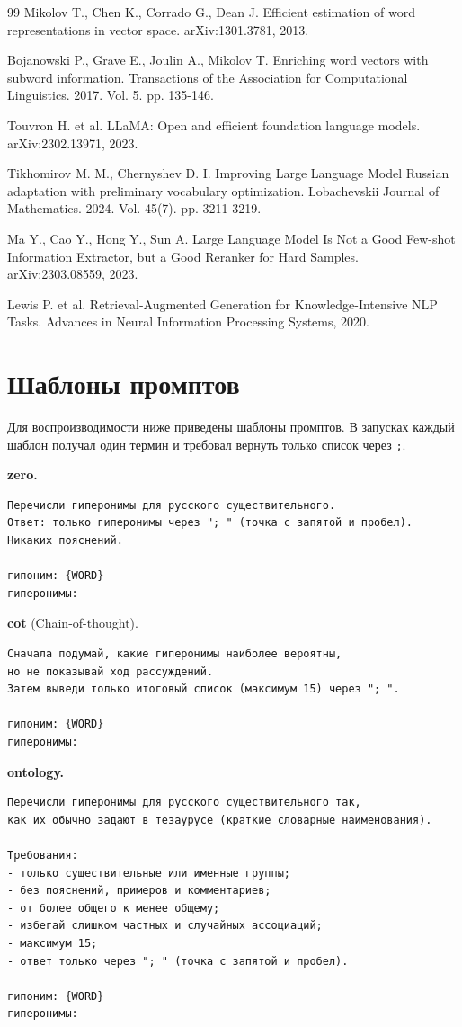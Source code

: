 \documentclass[12pt,a4paper,oneside,openany]{report}
\begin{document}
\begin{thebibliography}{99}
Mikolov T., Chen K., Corrado G., Dean J.
Efficient estimation of word representations in vector space.
arXiv:1301.3781, 2013.

Bojanowski P., Grave E., Joulin A., Mikolov T.
Enriching word vectors with subword information.
Transactions of the Association for Computational Linguistics. 2017. Vol. 5. pp. 135-146.

Touvron H. et al.
LLaMA: Open and efficient foundation language models.
arXiv:2302.13971, 2023.

Tikhomirov M. M., Chernyshev D. I.
Improving Large Language Model Russian adaptation with preliminary vocabulary optimization.
Lobachevskii Journal of Mathematics. 2024. Vol. 45(7). pp. 3211-3219.

Ma Y., Cao Y., Hong Y., Sun A.
Large Language Model Is Not a Good Few-shot Information Extractor, but a Good Reranker for Hard Samples.
arXiv:2303.08559, 2023.

Lewis P. et al.
Retrieval-Augmented Generation for Knowledge-Intensive NLP Tasks.
Advances in Neural Information Processing Systems, 2020.

\end{thebibliography}

\appendix
\chapter{Шаблоны промптов}

Для воспроизводимости ниже приведены шаблоны промптов. В запусках каждый шаблон получал один термин и требовал вернуть только список через \texttt{;}.

\textbf{zero.}
\begin{verbatim}
Перечисли гиперонимы для русского существительного.
Ответ: только гиперонимы через "; " (точка с запятой и пробел).
Никаких пояснений.

гипоним: {WORD}
гиперонимы:
\end{verbatim}

\textbf{cot} (Chain-of-thought).
\begin{verbatim}
Сначала подумай, какие гиперонимы наиболее вероятны,
но не показывай ход рассуждений.
Затем выведи только итоговый список (максимум 15) через "; ".

гипоним: {WORD}
гиперонимы:
\end{verbatim}

\textbf{ontology.}
\begin{verbatim}
Перечисли гиперонимы для русского существительного так,
как их обычно задают в тезаурусе (краткие словарные наименования).

Требования:
- только существительные или именные группы;
- без пояснений, примеров и комментариев;
- от более общего к менее общему;
- избегай слишком частных и случайных ассоциаций;
- максимум 15;
- ответ только через "; " (точка с запятой и пробел).

гипоним: {WORD}
гиперонимы:
\end{verbatim}
\end{document}
